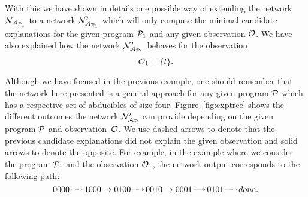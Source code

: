 \begin{table}
\end{table}

With this we have shown in details one possible way of extending the network $\mathcal{N}_{\mathcal{A}_{\mathcal{P}_1}}$ to a network $\mathcal{N}'_{\mathcal{A}_{\mathcal{P}_1}}$ which will only compute the minimal candidate explanations for the given program $\mathcal{P}_1$ and any given observation $\mathcal{O}$. We have also explained how the network $\mathcal{N}'_{\mathcal{A}_{\mathcal{P}_1}}$ behaves for the observation
\[
\mathcal{O}_1 = \{l\}.
\]

Although we have focused in the previous example, one should remember that the network here presented is a general approach for any given program $\mathcal{P}$ which has a respective set of abducibles of size four. Figure~\ref{fig:exptree} shows the different outcomes the network $\mathcal{N}'_{\mathcal{A}_{\mathcal{P}}}$ can provide depending on the given program $\mathcal{P}$ and observation~$\mathcal{O}$. We use dashed arrows to denote that the previous candidate explanations did not explain the given observation and solid arrows to denote the opposite. For example, in the example where we consider the program $\mathcal{P}_1$ and the observation $\mathcal{O}_1$, the network output corresponds to the following path:
\[
0000 \DashedArrow[->,densely dotted] 1000 \rightarrow 0100 \DashedArrow[->,densely dotted] 0010 \rightarrow 0001 \DashedArrow[->,densely dotted]  0101 \DashedArrow[->,densely dotted] done.
\]

